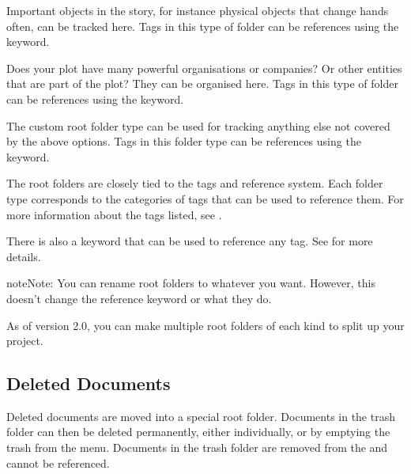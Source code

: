 \documentclass[a4paper,11pt,english]{sphinxmanual}
\begin{document}
\begin{description}
\sphinxAtStartPar
Important objects in the story, for instance physical objects that change hands often, can be
tracked here. Tags in this type of folder can be references using the  keyword.

\sphinxAtStartPar
Does your plot have many powerful organisations or companies? Or other entities that are part of
the plot? They can be organised here. Tags in this type of folder can be references using the
 keyword.

\sphinxAtStartPar
The custom root folder type can be used for tracking anything else not covered by the above
options. Tags in this folder type can be references using the  keyword.

\end{description}

\sphinxAtStartPar
The root folders are closely tied to the tags and reference system. Each folder type corresponds to
the categories of tags that can be used to reference them. For more information about the tags
listed, see {\hyperref[\detokenize{project_references:a-references-references}]{}}.

\sphinxAtStartPar
There is also a  keyword that can be used to reference any tag.
See {\hyperref[\detokenize{project_references:a-references-references}]{}} for more details.

\begin{sphinxadmonition}{note}{Note:}
\sphinxAtStartPar
You can rename root folders to whatever you want. However, this doesn’t change the reference
keyword or what they do.
\end{sphinxadmonition}

\sphinxAtStartPar
{}As of version 2.0, you can make multiple root folders of each kind to split up your project.


\subsection{Deleted Documents}
\label{\detokenize{project_overview:deleted-documents}}\label{\detokenize{project_overview:a-proj-roots-del}}
\sphinxAtStartPar
Deleted documents are moved into a special  root folder. Documents in the trash folder can
then be deleted permanently, either individually, or by emptying the trash from the menu. Documents
in the trash folder are removed from the {\hyperref[\detokenize{int_glossary:term-Project-Index}]{}} and cannot be referenced.
\end{document}
